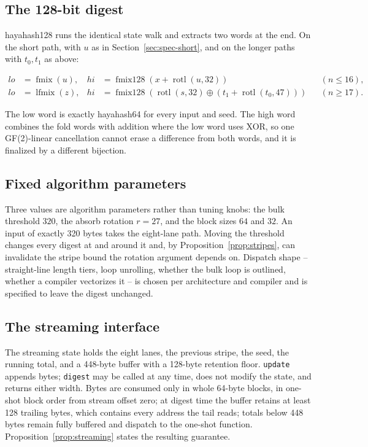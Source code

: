 \documentclass[10pt,a4paper]{article}
\theoremstyle{remark}
\newcommand{\rotl}{\operatorname{rotl}}
\newcommand{\fmix}{\operatorname{fmix}}
\newcommand{\fmixw}{\operatorname{fmix128}}
\newcommand{\lfmix}{\operatorname{lfmix}}
\begin{document}
\subsection{The 128-bit digest}
\label{sec:spec-128}

hayahash128 runs the identical state walk and extracts two words at the end.
On the short path, with \(u\) as in Section~\ref{sec:spec-short}, and on the
longer paths with \(t_0,t_1\) as above:

\begin{align*}
\mathit{lo} &= \fmix(u), &
\mathit{hi} &= \fmixw(x + \rotl(u,32)) & &(n \leq 16),\\
\mathit{lo} &= \lfmix(z), &
\mathit{hi} &= \fmixw(\rotl(s,32) \oplus (t_1 + \rotl(t_0,47))) & &(n \geq 17).
\end{align*}

The low word is exactly hayahash64 for every input and seed.  The high word
combines the fold words with addition where the low word uses XOR, so one
GF(2)-linear cancellation cannot erase a difference from both words, and it
is finalized by a different bijection.

\subsection{Fixed algorithm parameters}
\label{sec:spec-params}

Three values are algorithm parameters rather than tuning knobs: the bulk
threshold \(320\), the absorb rotation \(r=27\), and the block sizes
\(64\) and \(32\).  An input of exactly 320 bytes takes the eight-lane path.
Moving the threshold changes every digest at and around it and, by
Proposition~\ref{prop:stripes}, can invalidate the stripe bound the rotation
argument depends on.  Dispatch shape -- straight-line length tiers, loop
unrolling, whether the bulk loop is outlined, whether a compiler vectorizes
it -- is chosen per architecture and compiler and is specified to leave the
digest unchanged.

\subsection{The streaming interface}
\label{sec:spec-streaming}

The streaming state holds the eight lanes, the previous stripe, the seed, the
running total, and a 448-byte buffer with a 128-byte retention floor.
\texttt{update} appends bytes; \texttt{digest} may be called at any time,
does not modify the state, and returns either width.  Bytes are consumed only
in whole 64-byte blocks, in one-shot block order from stream offset zero; at
digest time the buffer retains at least 128 trailing bytes, which contains
every address the tail reads; totals below 448 bytes remain fully buffered
and dispatch to the one-shot function.  Proposition~\ref{prop:streaming}
states the resulting guarantee.
\end{document}
